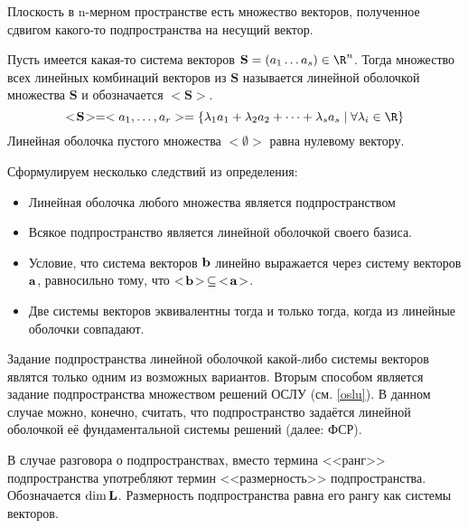 \begin{df}
  Плоскость в n-мерном пространстве есть множество векторов, полученное сдвигом какого-то подпространства на несущий вектор.
\end{df}

  \begin{df}
  Пусть имеется какая-то система векторов $\mathbf S=(a_1\dots a_s)\in\R^n$. Тогда множество всех линейных комбинаций векторов из $\mathbf S$ называется линейной оболочкой множества $\mathbf S$ и обозначается $<\!\mathbf S\!>$.
  $$<\!\mathbf S\!>=<a_1,\dots, a_r>=\{ \lambda_1a_1+\lambda_2a_2+\dots+\lambda_sa_s\mid\forall \lambda_i\in\R\}$$
  Линейная оболочка пустого множества $<\!\emptyset\!>$ равна нулевому вектору.
  \end{df}
  
  Сформулируем несколько следствий из определения:
  \begin{itemize}
    \item Линейная оболочка любого множества является подпространством
    \item Всякое подпространство является линейной оболочкой своего базиса.
    \item Условие, что система векторов ${\bf b}$ линейно выражается через систему векторов ${\bf a}$, равносильно тому, что $<\!{\bf b}\!>\,\subseteq\,<\!{\bf a}\!>$.
    \item Две системы векторов эквивалентны тогда и только тогда, когда из линейные оболочки совпадают.
  \end{itemize}
  
  Задание подпространства линейной оболочкой какой-либо системы векторов являтся только одним из возможных вариантов. Вторым способом является задание подпространства множеством решений ОСЛУ (см. \ref{oslu}). В данном случае можно, конечно, считать, что подпространство задаётся линейной оболочкой её фундаментальной системы решений (далее: ФСР).
  
  \begin{df}
    В случае разговора о подпространствах, вместо термина <<ранг>> подпространства употребляют термин <<размерность>> подпространства. Обозначается $\dim \mathbf{L}$. Размерность подпространства равна его рангу как системы векторов.
  \end{df}
